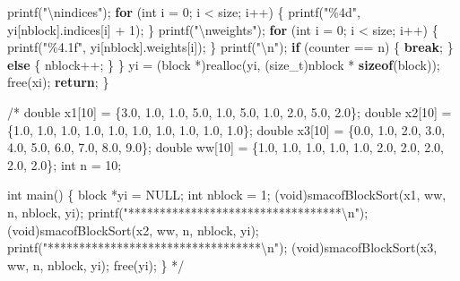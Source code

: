 \documentclass[
  12pt,
  letterpaper,
  DIV=11,
  numbers=noendperiod]{scrreprt}
\newenvironment{Shaded}{\begin{snugshade}}{\end{snugshade}}
\newcommand{\CommentTok}[1]{\textcolor[rgb]{0.37,0.37,0.37}{#1}}
\newcommand{\ControlFlowTok}[1]{\textcolor[rgb]{0.00,0.23,0.31}{\textbf{#1}}}
\newcommand{\DataTypeTok}[1]{\textcolor[rgb]{0.68,0.00,0.00}{#1}}
\newcommand{\DecValTok}[1]{\textcolor[rgb]{0.68,0.00,0.00}{#1}}
\newcommand{\KeywordTok}[1]{\textcolor[rgb]{0.00,0.23,0.31}{\textbf{#1}}}
\newcommand{\NormalTok}[1]{\textcolor[rgb]{0.00,0.23,0.31}{#1}}
\newcommand{\OperatorTok}[1]{\textcolor[rgb]{0.37,0.37,0.37}{#1}}
\newcommand{\SpecialCharTok}[1]{\textcolor[rgb]{0.37,0.37,0.37}{#1}}
\newcommand{\StringTok}[1]{\textcolor[rgb]{0.13,0.47,0.30}{#1}}
\theoremstyle{remark}
\begin{document}
\begin{Shaded}
\begin{Highlighting}[]
\NormalTok{        printf}\OperatorTok{(}\StringTok{"}\SpecialCharTok{\textbackslash{}n}\StringTok{indices"}\OperatorTok{);}
        \ControlFlowTok{for} \OperatorTok{(}\DataTypeTok{int}\NormalTok{ i }\OperatorTok{=} \DecValTok{0}\OperatorTok{;}\NormalTok{ i }\OperatorTok{\textless{}}\NormalTok{ size}\OperatorTok{;}\NormalTok{ i}\OperatorTok{++)} \OperatorTok{\{}
\NormalTok{            printf}\OperatorTok{(}\StringTok{"}\SpecialCharTok{\%4d}\StringTok{"}\OperatorTok{,}\NormalTok{ yi}\OperatorTok{[}\NormalTok{nblock}\OperatorTok{].}\NormalTok{indices}\OperatorTok{[}\NormalTok{i}\OperatorTok{]} \OperatorTok{+} \DecValTok{1}\OperatorTok{);}
        \OperatorTok{\}}
\NormalTok{        printf}\OperatorTok{(}\StringTok{"}\SpecialCharTok{\textbackslash{}n}\StringTok{weights"}\OperatorTok{);}
        \ControlFlowTok{for} \OperatorTok{(}\DataTypeTok{int}\NormalTok{ i }\OperatorTok{=} \DecValTok{0}\OperatorTok{;}\NormalTok{ i }\OperatorTok{\textless{}}\NormalTok{ size}\OperatorTok{;}\NormalTok{ i}\OperatorTok{++)} \OperatorTok{\{}
\NormalTok{            printf}\OperatorTok{(}\StringTok{"}\SpecialCharTok{\%4.1f}\StringTok{"}\OperatorTok{,}\NormalTok{ yi}\OperatorTok{[}\NormalTok{nblock}\OperatorTok{].}\NormalTok{weights}\OperatorTok{[}\NormalTok{i}\OperatorTok{]);}
        \OperatorTok{\}}
\NormalTok{        printf}\OperatorTok{(}\StringTok{"}\SpecialCharTok{\textbackslash{}n}\StringTok{"}\OperatorTok{);}
        \ControlFlowTok{if} \OperatorTok{(}\NormalTok{counter }\OperatorTok{==}\NormalTok{ n}\OperatorTok{)} \OperatorTok{\{}
            \ControlFlowTok{break}\OperatorTok{;}
        \OperatorTok{\}} \ControlFlowTok{else} \OperatorTok{\{}
\NormalTok{            nblock}\OperatorTok{++;}
        \OperatorTok{\}}
    \OperatorTok{\}}
\NormalTok{    yi }\OperatorTok{=} \OperatorTok{(}\NormalTok{block }\OperatorTok{*)}\NormalTok{realloc}\OperatorTok{(}\NormalTok{yi}\OperatorTok{,} \OperatorTok{(}\DataTypeTok{size\_t}\OperatorTok{)}\NormalTok{nblock }\OperatorTok{*} \KeywordTok{sizeof}\OperatorTok{(}\NormalTok{block}\OperatorTok{));}
\NormalTok{    free}\OperatorTok{(}\NormalTok{xi}\OperatorTok{);}
    \ControlFlowTok{return}\OperatorTok{;}
\OperatorTok{\}}

\CommentTok{/*}
\CommentTok{double x1[10] = \{3.0, 1.0, 1.0, 5.0, 1.0, 5.0, 1.0, 2.0, 5.0, 2.0\};}
\CommentTok{double x2[10] = \{1.0, 1.0, 1.0, 1.0, 1.0, 1.0, 1.0, 1.0, 1.0, 1.0\};}
\CommentTok{double x3[10] = \{0.0, 1.0, 2.0, 3.0, 4.0, 5.0, 6.0, 7.0, 8.0, 9.0\};}
\CommentTok{double ww[10] = \{1.0, 1.0, 1.0, 1.0, 1.0, 2.0, 2.0, 2.0, 2.0, 2.0\};}
\CommentTok{int n = 10;}

\CommentTok{int main() \{}
\CommentTok{    block *yi = NULL;}
\CommentTok{    int nblock = 1;}
\CommentTok{    (void)smacofBlockSort(x1, ww, n, nblock, yi);}
\CommentTok{    printf("**********************************\textbackslash{}n");}
\CommentTok{    (void)smacofBlockSort(x2, ww, n, nblock, yi);}
\CommentTok{    printf("**********************************\textbackslash{}n");}
\CommentTok{    (void)smacofBlockSort(x3, ww, n, nblock, yi);}
\CommentTok{    free(yi);}
\CommentTok{\}}
\CommentTok{*/}
\end{Highlighting}
\end{Shaded}
\end{document}
